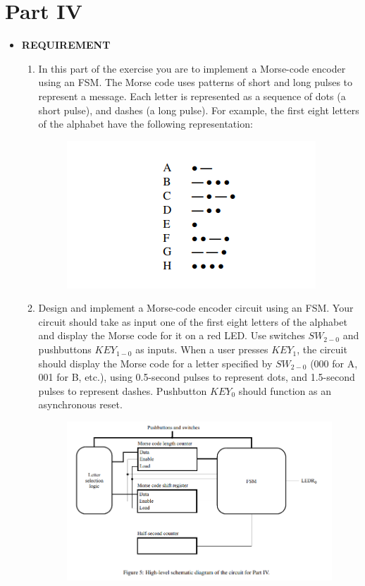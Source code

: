 \section{Part IV}
\begin{itemize}
    \item []\textbf{REQUIREMENT}
        \begin{enumerate}
            \item In this part of the exercise you are to implement a Morse-code encoder using an FSM. The Morse code uses patterns of short and long pulses to represent a message. Each letter is represented as a sequence of dots (a short pulse), and dashes (a long pulse). For example, the first eight letters of the alphabet have the following representation:
                \begin{figure}[h]
                    \centering
                    \includegraphics[scale = 0.8]{source/picture/Lab7/Lab7_1.png}
                    \caption{}
                \end{figure}
            \item Design and implement a Morse-code encoder circuit using an FSM. Your circuit should take as input one of the first eight letters of the alphabet and display the Morse code for it on a red LED. Use switches $SW_{2-0}$ and pushbuttons $KEY_{1-0}$ as inputs. When a user presses $KEY_1$, the circuit should display the Morse code for a letter specified by $SW_{2-0}$ (000 for A, 001 for B, etc.), using 0.5-second pulses to represent dots, and 1.5-second pulses to represent dashes. Pushbutton $KEY_0$ should function as an asynchronous reset. 
                \begin{figure}[h]
                    \centering
                    \includegraphics[scale = 0.8]{source/picture/Lab7/Lab7_2.png}
                \end{figure}
        \end{enumerate}
\clearpage


\end{itemize}
